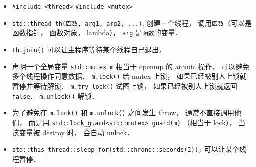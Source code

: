 
\begin{itemize}
\item \verb|#include <thread>| \verb|#include <mutex>|
\item \verb|std::thread th(函数, arg1, arg2, ...)|; 创建一个线程， 调用\verb|函数|（可以是函数指针， 函数对象， lambda）， \verb|arg| 是\verb|函数|的变量．
\item \verb|th.join()| 可以让主程序等待某个线程自己退出．
\item 声明一个全局变量 \verb|std::mutex m| 相当于 openmp 的 atomic 操作， 可以避免多个线程操作同意数据． \verb|m.lock()| 给 mutex 上锁， 如果已经被别人上锁就暂停并等待解锁． \verb|m.try_lock()| 试图上锁， 如果已经被别人上锁就返回 \verb|false|． \verb|m.unlock()| 解锁．
\item 为了避免在 \verb|m.lock()| 和 \verb|m.unlock()| 之间发生 throw， 通常不直接调用他们， 而是用 \verb|std::lock_guard<std::mutex> guard(m)| （相当于 lock）， 当该变量被 destroy 时， 会自动 unlock．
\item \verb|std::this_thread::sleep_for(std::chrono::seconds(2));| 可以让某个线程暂停．
\end{itemize}
